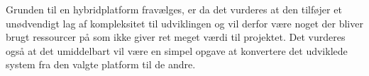 Grunden til en hybridplatform fravælges, er da det vurderes at den tilføjer et unødvendigt lag af kompleksitet til udviklingen og vil derfor være noget der bliver brugt ressourcer på som ikke giver ret meget værdi til projektet.
Det vurderes også at det umiddelbart vil være en simpel opgave at konvertere det udviklede system fra den valgte platform til de andre. 
